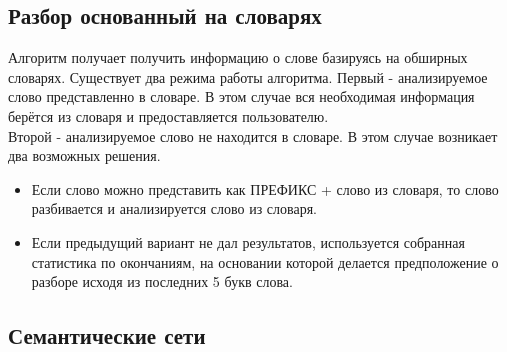 \subsection{Разбор основанный на словарях}
Алгоритм получает получить информацию о слове базируясь на обширных словарях. Существует два режима работы алгоритма.
Первый - анализируемое слово представленно в словаре. В этом случае вся необходимая информация берётся из словаря и предоставляется пользователю.\\
Второй - анализируемое слово не находится в словаре. В этом случае возникает два возможных решения.
\begin{itemize}
\item Если слово можно представить как ПРЕФИКС + слово из словаря, то слово разбивается и анализируется слово из словаря.
\item Если предыдущий вариант не дал результатов, используется собранная статистика по окончаниям, на основании которой делается предположение о разборе исходя из последних 5 букв слова.
\end{itemize}\cite{pymorphy}

\subsection{Семантические сети}
